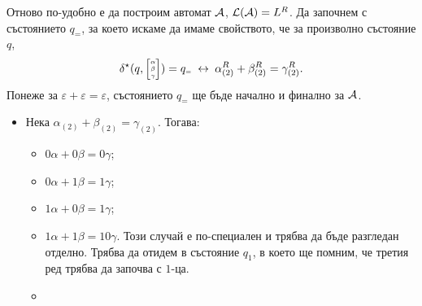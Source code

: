 \begin{hint}
  Отново по-удобно е да построим автомат $\A$, $\L(\A) = L^R$.
  Да започнем с състоянието $q_{\scriptscriptstyle{=}}$, за което искаме да имаме свойството, че за произволно състояние $q$,
  \[\delta^\star(q, \tiny{ \begin{bmatrix} \alpha\\ \beta \\ \gamma\end{bmatrix} }) = q_{\scriptscriptstyle{=}}  \iff \alpha^R_{(2)} + \beta^R_{(2)} = \gamma^R_{(2)}.\]
  Понеже за $\varepsilon + \varepsilon = \varepsilon$, състоянието $q_{\scriptscriptstyle{=}}$ ще бъде начално и финално за $\A$.
  \begin{itemize}
  \item 
    Нека $\alpha_{(2)}+\beta_{(2)} = \gamma_{(2)}$. Тогава:
    \begin{itemize}
    \item 
      $0\alpha + 0\beta = 0\gamma$;
    \item
      $0\alpha + 1\beta = 1\gamma$;
    \item
      $1\alpha + 0\beta = 1\gamma$;
    \item
      $1\alpha + 1\beta = 10\gamma$. Този случай е по-специален и трябва да бъде разгледан отделно.
      Трябва да отидем в състояние $q_1$, в което ще помним, че третия ред трябва да започва с $1$-ца.
    \item

\end{itemize}
\end{itemize}
\end{hint}
